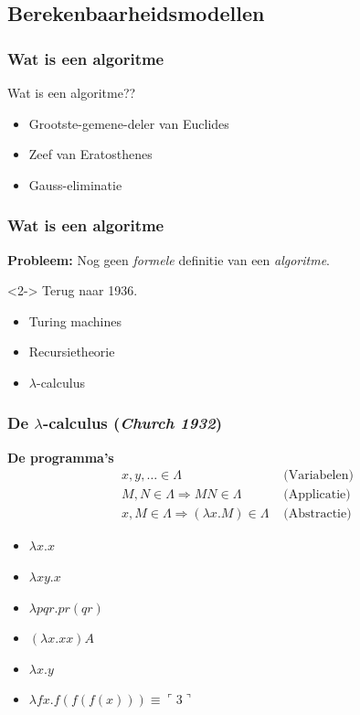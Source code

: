 \documentclass{beamer}
\begin{document}
\subsection{Berekenbaarheidsmodellen}
\begin{frame} 
    \frametitle{Wat is een algoritme}
    {\Large Wat is een algoritme??}
    \vspace{1cm}
    \begin{itemize}
        \item<1-> Grootste-gemene-deler van Euclides
        \item<2-> Zeef van Eratosthenes
        \item<3-> Gauss-eliminatie
    \end{itemize}
\end{frame}
\begin{frame} 
    \frametitle{Wat is een algoritme}

    \textbf{Probleem:} Nog geen \emph{formele} definitie van een \emph{algoritme}.
    \\
    \vspace{1cm}
    \begin{onlyenv}<2->
        Terug naar 1936.
        \begin{itemize}
            \item<4-> Turing machines
            \item<5-> Recursietheorie
            \item<6-> $\lambda$-calculus
        \end{itemize}        
    \end{onlyenv}
\end{frame}

\begin{frame}
    \frametitle{De $\lambda$-calculus (\emph{Church 1932})}
    \textbf{De programma's}
    \begin{align*}
        x,y,\ldots \in \Lambda & \text{  (Variabelen)}\\
        M,N\in \Lambda \Rightarrow MN \in \Lambda & \text{  (Applicatie)} \\
        x, M\in \Lambda \Rightarrow (\lambda x.M) \in \Lambda & \text{  (Abstractie)}
    \end{align*}
    \begin{itemize}
        \item $\lambda x.x$
        \item $\lambda xy.x$
        \item $\lambda pqr.pr(qr)$
        \item $(\lambda x.xx)A$
        \item $\lambda x.y$
        \item $\lambda fx.f(f(f(x))) \equiv \ulcorner 3 \urcorner$
    \end{itemize}    
\end{frame}
\end{document}
